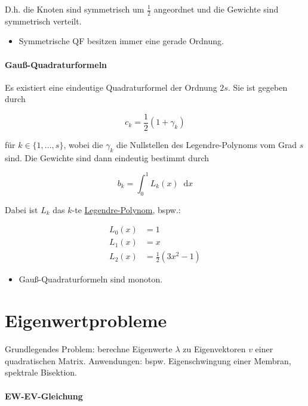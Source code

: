 \documentclass[a4paper, 14pt]{article}
\newcommand*\diff{\mathop{}\!\mathrm{d}}
\begin{document}
	D.h. die Knoten sind symmetrisch um $\frac{1}{2}$ angeordnet und die Gewichte sind symmetrisch verteilt.

	\begin{itemize}
		\item Symmetrische QF besitzen immer eine gerade Ordnung.
	\end{itemize}

	\paragraph{Gauß-Quadraturformeln}

	Es existiert eine eindeutige Quadraturformel der Ordnung $2s$.
	Sie ist gegeben durch

	\begin{equation}
		c_k = \frac{1}{2}(1 + \gamma_k)
	\end{equation}

	für $k \in \{1, ..., s\}$, wobei die $\gamma_k$ die Nullstellen des Legendre-Polynoms vom Grad $s$ sind.
	Die Gewichte sind dann eindeutig bestimmt durch

	\begin{equation}
		b_k = \int_0^1{L_k(x) \diff x}
	\end{equation}

	Dabei ist $L_k$ das $k$-te \href{https://de.wikipedia.org/wiki/Legendre-Polynom}{Legendre-Polynom}, bspw.:

	\begin{align}
		L_0(x) & = 1 \\
		L_1(x) & = x \\
		L_2(x) & = \frac{1}{2}(3x^2 - 1)
	\end{align}

	\begin{itemize}
		\item Gauß-Quadraturformeln sind monoton.
	\end{itemize}

	\section{Eigenwertprobleme}

	Grundlegendes Problem: berechne Eigenwerte $\lambda$ zu Eigenvektoren $v$ einer quadratischen Matrix.
	Anwendungen: bspw. Eigenschwingung einer Membran, spektrale Bisektion.

	\paragraph{EW-EV-Gleichung}
\end{document}
